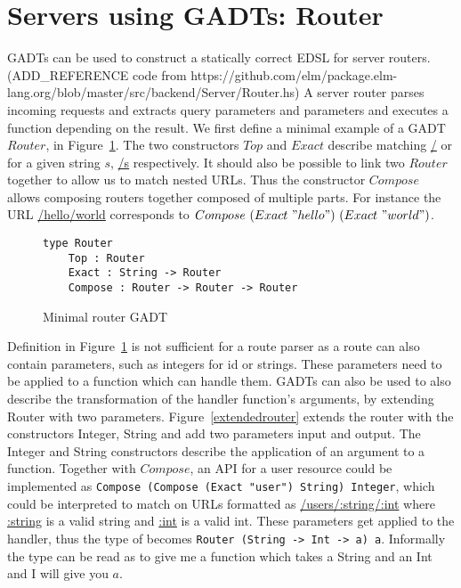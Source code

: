 \section{Servers using GADTs: Router}\label{router}

GADTs can be used to construct a statically correct EDSL for server
routers.(ADD\_REFERENCE code from
https://github.com/elm/package.elm-lang.org/blob/master/src/backend/Server/Router.hs)
A server router parses incoming requests and extracts query parameters and
parameters and executes a function depending on the result. We first define a
minimal example of a GADT $Router$, in Figure~\ref{routergadtminimal}.  The two
constructors $Top$ and $Exact$ describe matching \url{/} or for a given string
$s$, \url{/s} respectively. It should also be possible to link two $Router$
together to allow us to match nested URLs. Thus the constructor $Compose$ allows
composing routers together composed of multiple parts.  For instance the URL
\url{/hello/world} corresponds to $Compose\ (Exact\ "hello")\ (Exact\ "world")$.

\begin{figure}[H]
    \begin{lstlisting}
type Router 
    Top : Router 
    Exact : String -> Router 
    Compose : Router -> Router -> Router
    \end{lstlisting}
    \caption{Minimal router GADT}
    \label{routergadtminimal}
\end{figure}


Definition in Figure~\ref{routergadtminimal} is not sufficient for a route
parser as a route can also contain parameters, such as integers for id or
strings. These parameters need to be applied to a function which can handle
them. GADTs can also be used to also describe the transformation of the handler
function's arguments, by extending Router with two parameters.
Figure~\ref{extendedrouter} extends the router with the constructors Integer,
String and add two parameters input and output. The Integer and String
constructors describe the application of an argument to a function. Together
with $Compose$, an API for a user resource could be implemented as
\texttt{Compose (Compose (Exact "user") String) Integer}, which could be
interpreted to match on URLs formatted as \url{/users/:string/:int} where
\url{:string} is a valid string and \url{:int} is a valid int. These parameters
get applied to the handler, thus the type of becomes \texttt{Router (String ->
Int -> a) a}. Informally the type can be read as to give me a function which
takes a String and an Int and I will give you $a$.

